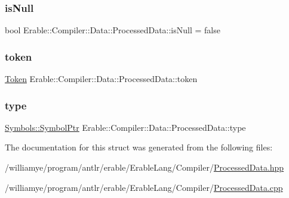 \mbox{\label{struct_erable_1_1_compiler_1_1_data_1_1_processed_data_a8b85722907d1221f76b9e0469968ee73}} 
\subsubsection{\texorpdfstring{isNull}{isNull}}
{\footnotesize\ttfamily bool Erable\+::\+Compiler\+::\+Data\+::\+Processed\+Data\+::is\+Null = false}

\mbox{\label{struct_erable_1_1_compiler_1_1_data_1_1_processed_data_acca79c74d6614ba873b4699b56550fc2}} 
\subsubsection{\texorpdfstring{token}{token}}
{\footnotesize\ttfamily \mbox{\hyperlink{struct_token}{Token}} Erable\+::\+Compiler\+::\+Data\+::\+Processed\+Data\+::token}

\mbox{\label{struct_erable_1_1_compiler_1_1_data_1_1_processed_data_a891ed9e3f277ec69809cd3153da88a9c}} 
\subsubsection{\texorpdfstring{type}{type}}
{\footnotesize\ttfamily \mbox{\hyperlink{namespace_erable_1_1_compiler_1_1_symbols_a8f0bc762f448ea4d84e8713ab3e140b9}{Symbols\+::\+Symbol\+Ptr}} Erable\+::\+Compiler\+::\+Data\+::\+Processed\+Data\+::type}



The documentation for this struct was generated from the following files\+:\begin{DoxyCompactItemize}
\item 
/williamye/program/antlr/erable/\+Erable\+Lang/\+Compiler/\mbox{\hyperlink{_processed_data_8hpp}{Processed\+Data.\+hpp}}\item 
/williamye/program/antlr/erable/\+Erable\+Lang/\+Compiler/\mbox{\hyperlink{_processed_data_8cpp}{Processed\+Data.\+cpp}}\end{DoxyCompactItemize}
